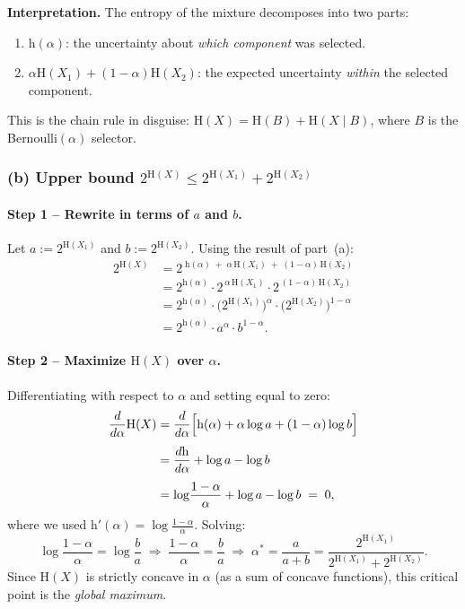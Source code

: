 \documentclass[12pt,a4paper]{article}
\theoremstyle{plain}
\theoremstyle{definition}
\theoremstyle{remark}
\newcommand{\HH}{\mathrm{H}}
\newcommand{\hb}{\mathrm{h}}          %
\begin{document}
\begin{notebox}
\textbf{Interpretation.}
The entropy of the mixture decomposes into two parts:
\begin{enumerate}
  \item $\hb(\alpha)$: the uncertainty about \emph{which component} was selected.
  \item $\alpha\HH(X_1)+(1-\alpha)\HH(X_2)$: the expected uncertainty
        \emph{within} the selected component.
\end{enumerate}
This is the chain rule in disguise: $\HH(X) = \HH(B) + \HH(X\mid B)$,
where $B$ is the Bernoulli$(\alpha)$ selector.
\end{notebox}

\subsubsection*{(b) Upper bound $2^{\HH(X)} \le 2^{\HH(X_1)} + 2^{\HH(X_2)}$}

\paragraph{Step 1 – Rewrite in terms of $a$ and $b$.}

Let $a := 2^{\HH(X_1)}$ and $b := 2^{\HH(X_2)}$.  Using the result of part~(a):
\begin{align*}
  2^{\HH(X)}
    &= 2^{\;\hb(\alpha) \;+\; \alpha\,\HH(X_1) \;+\; (1-\alpha)\,\HH(X_2)}\\[4pt]
    &= 2^{\hb(\alpha)}\cdot 2^{\,\alpha\,\HH(X_1)}\cdot 2^{\,(1-\alpha)\,\HH(X_2)}\\[4pt]
    &= 2^{\hb(\alpha)}\cdot \bigl(2^{\HH(X_1)}\bigr)^{\!\alpha}
                           \cdot\bigl(2^{\HH(X_2)}\bigr)^{\!1-\alpha}\\[4pt]
    &= 2^{\hb(\alpha)}\cdot a^{\alpha}\cdot b^{1-\alpha}.
\end{align*}

\paragraph{Step 2 – Maximize $\HH(X)$ over $\alpha$.}

Differentiating with respect to $\alpha$ and setting equal to zero:
\begin{align*}
  \frac{d}{d\alpha}\HH(X)
    &= \frac{d}{d\alpha}\Bigl[\hb(\alpha) + \alpha\log a + (1-\alpha)\log b\Bigr]\\[4pt]
    &= \frac{d\hb}{d\alpha} + \log a - \log b\\[4pt]
    &= \log\!\frac{1-\alpha}{\alpha} + \log a - \log b \;=\; 0,
\end{align*}
where we used $\hb'(\alpha) = \log\!\frac{1-\alpha}{\alpha}$.  Solving:
\[
  \log\!\frac{1-\alpha}{\alpha} = \log\!\frac{b}{a}
  \;\Longrightarrow\;
  \frac{1-\alpha}{\alpha} = \frac{b}{a}
  \;\Longrightarrow\;
  \boxed{\alpha^* = \frac{a}{a+b} = \frac{2^{\HH(X_1)}}{2^{\HH(X_1)}+2^{\HH(X_2)}}.}
\]
Since $\HH(X)$ is strictly concave in $\alpha$ (as a sum of concave functions),
this critical point is the \emph{global maximum}.
\end{document}

